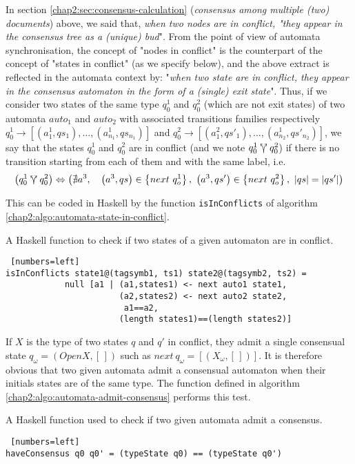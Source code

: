 In section \ref{chap2:sec:consensus-calculation} (\textit{consensus among multiple (two) documents}) above, we said that, \textit{when two nodes are in conflict, "they appear in the consensus tree as a (unique) bud}". From the point of view of automata synchronisation, the concept of "nodes in conflict" is the counterpart of the concept of "states in conflict" (as we specify below), and the above extract is reflected in the automata context by:  "\textit{when two \textit{state} are in conflict, they appear in the \textit{consensus automaton} in the form of a (single) exit state}". 
Thus, if we consider two states of the same type $q_0^1$ and $q^2_0$ (which are not exit states) of two automata $auto_1$ and $auto_2$ with associated transitions families respectively $q_0^1 \rightarrow [(a^1_{1}, qs_1), \dots, (a^1_{n_1}, qs_{n_1})]$ and $q^2_0 \rightarrow [(a^2_{1}, qs'_1), \dots, (a^1_{n_2}, qs'_{n_2})]$, we say that the states $q^1_0$ and $q^2_0$ are in conflict (and we note $q^1_0 \curlyveeuparrow q^2_0$) if there is no transition starting from each of them and with the same label, i.e.  
\[\left(q^1_0 \curlyveeuparrow q^2_0\right) \Leftrightarrow \left(\nexists a^3, ~~~\left(a^3, qs\right) \in \left\{next~ q_o^1\right\}, ~\left(a^3, qs'\right) \in \left\{next~ q_o^2\right\}, ~|qs|=|qs'|\right)\]

This can be coded in Haskell by the function \Verb|isInConflicts| of algorithm \ref{chap2:algo:automata-state-in-conflict}.

\begin{algorithm}
\small
\caption{A Haskell function to check if two states of a given automaton are in conflict.}
\label{chap2:algo:automata-state-in-conflict}
\begin{Verbatim} [numbers=left]
isInConflicts state1@(tagsymb1, ts1) state2@(tagsymb2, ts2) = 
            null [a1 | (a1,states1) <- next auto1 state1,
                       (a2,states2) <- next auto2 state2,
                        a1==a2,
                       (length states1)==(length states2)]
\end{Verbatim}
\end{algorithm}


If $X$ is the type of two states $q$ and $q'$ in conflict, they admit a single consensual state $q_{\omega}=(Open X, [\,])$ such as $next~ q_{\omega} = [(X_{\omega}, [\,])]$. It is therefore obvious that two given automata admit a consensual automaton when their initials states are of the same type. The function defined in algorithm \ref{chap2:algo:automata-admit-consensus} performs this test.
\begin{algorithm}
\small
\caption{A Haskell function used to check if two given automata admit a consensus.}
\label{chap2:algo:automata-admit-consensus}
\begin{Verbatim} [numbers=left]
haveConsensus q0 q0' = (typeState q0) == (typeState q0')
\end{Verbatim}
\end{algorithm}

